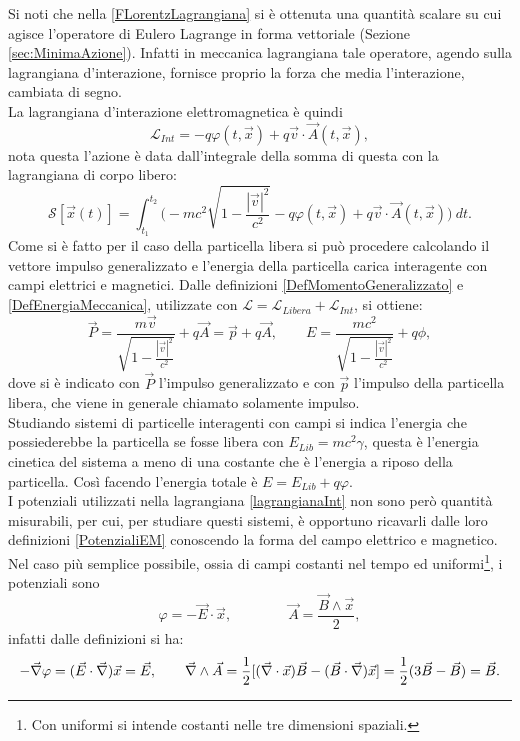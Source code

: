 Si noti che nella \eqref{FLorentzLagrangiana} si è ottenuta una quantità scalare su cui agisce l'operatore di Eulero Lagrange in forma vettoriale (Sezione \ref{sec:MinimaAzione}). Infatti in meccanica lagrangiana tale operatore, agendo sulla lagrangiana d'interazione, fornisce proprio la forza che media l'interazione, cambiata di segno.\\ La lagrangiana d'interazione elettromagnetica è quindi
\begin{equation}
    \label{lagrangianaInt}
    \mathcal{L}_{Int}=-q\varphi(t,\vec x)+q\vec v\cdot\vec A(t,\vec x),
\end{equation}
nota questa l'azione è data dall'integrale della somma di questa con la lagrangiana di corpo libero:
\begin{equation}
    \mathcal{S} [\vec x(t)]=\int_{t_1}^{t_2}\bigg(-mc^2\sqrt{1-\frac{|\vec v|^2}{c^2}}-q\varphi(t,\vec x)+q\vec v\cdot\vec A(t,\vec x)\bigg)\ dt.\label{AzioneFree+Int}
\end{equation}
Come si è fatto per il caso della particella libera si può procedere calcolando il vettore impulso generalizzato e l'energia della particella carica interagente con campi elettrici e magnetici. Dalle definizioni \eqref{DefMomentoGeneralizzato} e \eqref{DefEnergiaMeccanica}, utilizzate con $\mathcal{L} =\mathcal{L}_{Libera}+\mathcal{L}_{Int}$, si ottiene:
\begin{equation}
    \vec{P}=\frac{m\vec v}{\sqrt{1-\frac{|\vec v|^2}{c^2}}}+q\vec A=\vec{p}+q\vec A,\qquad E=\frac{mc^2}{\sqrt{1-\frac{|\vec v|^2}{c^2}}}+q\phi,\label{energiaImpulsoIntEM}
\end{equation}
dove si è indicato con $\vec P$ l'impulso generalizzato e con $\vec p$ l'impulso della particella libera, che viene in generale chiamato solamente impulso.\\Studiando sistemi di particelle interagenti con campi si indica l'energia che possiederebbe la particella se fosse libera con $E_{Lib}=mc^2\gamma$, questa è l'energia cinetica del sistema a meno di una costante che è l'energia a riposo della particella. Così facendo l'energia totale è $E=E_{Lib}+q\varphi$.\\

I potenziali utilizzati nella lagrangiana \eqref{lagrangianaInt} non sono però quantità misurabili, per cui, per studiare questi sistemi, è opportuno ricavarli dalle loro definizioni \eqref{PotenzialiEM} conoscendo la forma del campo elettrico e magnetico. Nel caso più semplice possibile, ossia di campi costanti nel tempo ed uniformi\footnote{Con uniformi si intende costanti nelle tre dimensioni spaziali.}, i potenziali sono 
\begin{equation}
    \varphi=-\vec E\cdot\vec x, \qquad \qquad \vec A=\frac{\vec B\wedge \vec x}{2},\label{PotenzialiCostanti}
\end{equation}
infatti dalle definizioni si ha:
\begin{equation*}
    -\vec{\nabla}{\varphi}=(\vec E\cdot\vec{\nabla})\vec x=\vec{E},\qquad \vec{\nabla}\wedge\vec A=\frac{1}{2}[ (\vec{\nabla}\cdot\vec x)\vec B-(\vec B\cdot \vec{\nabla})\vec x]=\frac{1}{2}(3\vec B -\vec B)=\vec B.
\end{equation*}

